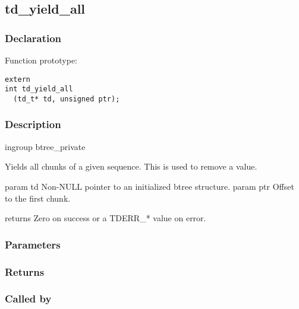 
\newpage
\subsection{td\_yield\_all}
\subsubsection{Declaration} Function prototype:

\begin{verbatim}
extern
int td_yield_all
  (td_t* td, unsigned ptr);
\end{verbatim}

\subsubsection{Description}


 ingroup btree\_private

 Yields all chunks of a given sequence. This is used to remove a value.

 param td Non-NULL pointer to an initialized btree structure.
 param ptr Offset to the first chunk.

 returns Zero on success or a TDERR\_* value on error.
 

\subsubsection{Parameters}
\subsubsection{Returns}
\subsubsection{Called by}
